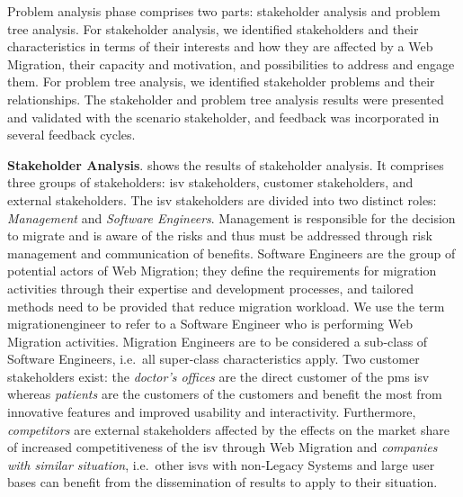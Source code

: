 Problem analysis phase comprises two parts: stakeholder analysis and problem tree analysis.
For stakeholder analysis, we identified stakeholders and their characteristics in terms of their interests and how they are affected by a \gls{Web Migration}, their capacity and motivation, and possibilities to address and engage them.
For problem tree analysis, we identified stakeholder problems and their relationships.
The stakeholder and problem tree analysis results were presented and validated with the scenario stakeholder, and feedback was incorporated in several feedback cycles.

\textbf{Stakeholder Analysis}.
 shows the results of stakeholder analysis.
It comprises three groups of stakeholders: \gls{isv} stakeholders, customer stakeholders, and external stakeholders.
The \gls{isv} stakeholders are divided into two distinct roles: \emph{Management} and \emph{Software Engineers}.
Management is responsible for the decision to migrate and is aware of the risks and thus must be addressed through \gls{risk management} and communication of benefits.
Software Engineers are the group of potential actors of \gls{Web Migration}; they define the requirements for migration activities through their expertise and development processes, and tailored methods need to be provided that reduce migration workload.
We use the term \gls{migrationengineer} to refer to a Software Engineer who is performing \gls{Web Migration} activities.
Migration Engineers are to be considered a sub-class of Software Engineers, i.e.~all super-class characteristics apply.
Two customer stakeholders exist: the \emph{doctor's offices} are the direct customer of the \gls{pms} \gls{isv} whereas \emph{patients} are the customers of the customers and benefit the most from innovative features and improved usability and interactivity.
Furthermore, \emph{competitors} are external stakeholders affected by the effects on the market share of increased competitiveness of the \gls{isv} through \gls{Web Migration} and \emph{companies with similar situation}, i.e.~other \glspl{isv} with non-\glspl{Legacy System} and large user bases can benefit from the dissemination of results to apply to their situation.


